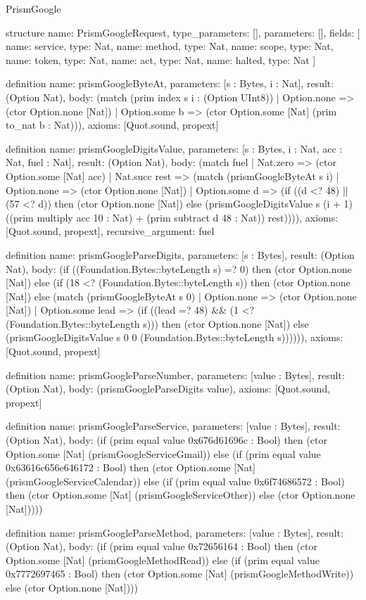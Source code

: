 \begin{lexlean}{PrismGoogle}
\begin{semanticmodule}
structure{
  name: PrismGoogleRequest,
  type_parameters: [],
  parameters: [],
  fields: [
    {name: service, type: Nat},
    {name: method, type: Nat},
    {name: scope, type: Nat},
    {name: token, type: Nat},
    {name: act, type: Nat},
    {name: halted, type: Nat}
  ]
}

definition{
  name: prismGoogleByteAt,
  parameters: [s : Bytes, i : Nat],
  result: (Option Nat),
  body: (match (prim index s i : (Option UInt8))
    | Option.none => (ctor Option.none [Nat])
    | Option.some b => (ctor Option.some [Nat] (prim to_nat b : Nat))),
  axioms: [Quot.sound, propext]
}

definition{
  name: prismGoogleDigitsValue,
  parameters: [s : Bytes, i : Nat, acc : Nat, fuel : Nat],
  result: (Option Nat),
  body: (match fuel
    | Nat.zero => (ctor Option.some [Nat] acc)
    | Nat.succ rest => (match (prismGoogleByteAt s i)
      | Option.none => (ctor Option.none [Nat])
      | Option.some d => (if ((d <? 48) || (57 <? d)) then (ctor Option.none [Nat]) else (prismGoogleDigitsValue s (i + 1) ((prim multiply acc 10 : Nat) + (prim subtract d 48 : Nat)) rest)))),
  axioms: [Quot.sound, propext],
  recursive_argument: fuel
}

definition{
  name: prismGoogleParseDigits,
  parameters: [s : Bytes],
  result: (Option Nat),
  body: (if ((Foundation.Bytes::byteLength s) =? 0) then (ctor Option.none [Nat]) else (if (18 <? (Foundation.Bytes::byteLength s)) then (ctor Option.none [Nat]) else (match (prismGoogleByteAt s 0)
    | Option.none => (ctor Option.none [Nat])
    | Option.some lead => (if ((lead =? 48) && (1 <? (Foundation.Bytes::byteLength s))) then (ctor Option.none [Nat]) else (prismGoogleDigitsValue s 0 0 (Foundation.Bytes::byteLength s)))))),
  axioms: [Quot.sound, propext]
}

definition{
  name: prismGoogleParseNumber,
  parameters: [value : Bytes],
  result: (Option Nat),
  body: (prismGoogleParseDigits value),
  axioms: [Quot.sound, propext]
}

definition{
  name: prismGoogleParseService,
  parameters: [value : Bytes],
  result: (Option Nat),
  body: (if (prim equal value 0x676d61696c : Bool) then (ctor Option.some [Nat] (prismGoogleServiceGmail)) else (if (prim equal value 0x63616c656e646172 : Bool) then (ctor Option.some [Nat] (prismGoogleServiceCalendar)) else (if (prim equal value 0x6f74686572 : Bool) then (ctor Option.some [Nat] (prismGoogleServiceOther)) else (ctor Option.none [Nat]))))
}

definition{
  name: prismGoogleParseMethod,
  parameters: [value : Bytes],
  result: (Option Nat),
  body: (if (prim equal value 0x72656164 : Bool) then (ctor Option.some [Nat] (prismGoogleMethodRead)) else (if (prim equal value 0x7772697465 : Bool) then (ctor Option.some [Nat] (prismGoogleMethodWrite)) else (ctor Option.none [Nat])))
}


\end{semanticmodule}
\end{lexlean}
